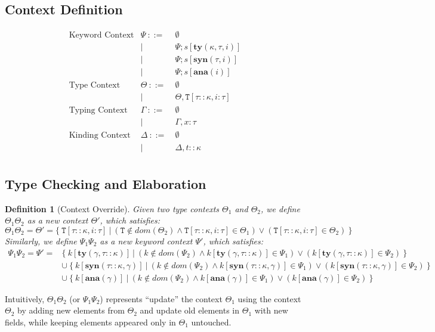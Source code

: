 \documentclass[letterpaper, notitlepage]{article}
\newcommand{\T}{\mathtt{T}}
\newtheorem{definition}{Definition}
\begin{document}
\subsection{Context Definition}
\[
\begin{array}{rrl}
\text{Keyword Context}	&	\Psi 	~::=&~ 	\emptyset\\
						&			| ~ &~ 	\Psi;s[\mathbf{ty}(\kappa,\tau,i)]\\
						&			| ~ &~ 	\Psi;s[\mathbf{syn}(\tau,i)]\\
						&			| ~ &~ 	\Psi;s[\mathbf{ana}(i)]\\
\text{Type Context}		&	\Theta 	~::=&~ \emptyset\\
						&			| ~ &~ \Theta,\T[\tau::\kappa,i:\tau] \\
\text{Typing Context}	&	\Gamma 	~::=&~ \emptyset\\
						&			| ~ &~ \Gamma,x:\tau\\
\text{Kinding Context}	& 	\Delta	~::=&~ \emptyset\\
						& 			| ~ &~ \Delta,t::\kappa\\
\end{array}
\]

\subsection{Type Checking and Elaboration}
\begin{definition}[Context Override]Given two type contexts $\Theta_1$ and $\Theta_2$, we define $\Theta_1\Theta_2$ as a new context $\Theta'$, which satisfies:
\[
	\Theta_1\Theta_2 = \Theta' = \{~\T[\tau::\kappa,i:\tau]~|~ (\T\notin dom(\Theta_2)\land \T[\tau::\kappa,i:\tau]\in\Theta_1)\lor(\T[\tau::\kappa,i:\tau]\in\Theta_2) ~\}
\]
Similarly, we define $\Psi_1\Psi_2$ as a new keyword context $\Psi'$, which satisfies:
\[
	\begin{array}{rl}
	\Psi_1\Psi_2=\Psi'=&\{~k[\mathbf{ty}(\gamma,\tau::\kappa)]~|~ (k\notin dom(\Psi_2) \land k[\mathbf{ty}(\gamma,\tau::\kappa)]\in\Psi_1)\lor(k[\mathbf{ty}(\gamma,\tau::\kappa)]\in\Psi_2)  ~\}\\
							 &\cup~\{~k[\mathbf{syn}(\tau::\kappa,\gamma)]~|~ (k\notin dom(\Psi_2) \land k[\mathbf{syn}(\tau::\kappa,\gamma)]\in\Psi_1) \lor(k[\mathbf{syn}(\tau::\kappa,\gamma)]\in\Psi_2)  ~\}\\
							 &\cup~\{~k[\mathbf{ana}(\gamma)]~|~ (k\notin dom(\Psi_2) \land k[\mathbf{ana}(\gamma)]\in\Psi_1) \lor(k[\mathbf{ana}(\gamma)]\in\Psi_2)  ~\}
	\end{array}
\]
\end{definition}
Intuitively, $\Theta_1\Theta_2$ (or $\Psi_1\Psi_2$) represents ``update'' the context $\Theta_1$ using the context $\Theta_2$ by adding new elements from $\Theta_2$ and update old elements in $\Theta_1$ with new fields, while keeping elements appeared only in $\Theta_1$ untouched.
\end{document}
